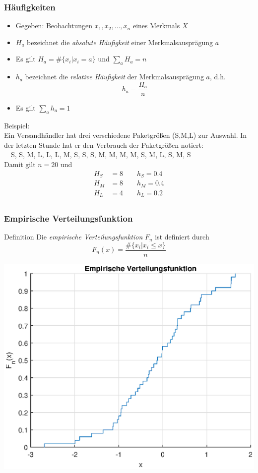 \begin{frame}
\frametitle{Häufigkeiten}
\begin{itemize}
\item Gegeben: Beobachtungen $x_1,x_2,\ldots,x_n$ eines Merkmals $X$
\pause
\item $H_a$ bezeichnet die \textit{absolute Häufigkeit} einer Merkmalsausprägung $a$
\pause
\item Es gilt $H_a = \# \{x_i | x_i=a \}$ und $\sum_a H_a = n$
\pause
\item $h_a$ bezeichnet die \textit{relative Häufigkeit} der Merkmalsausprägung $a$, d.h. \[
h_a = \frac{H_a}{n} \]
\pause
\item Es gilt $\sum_a h_a = 1$
\pause
\end{itemize}
\pause
Beispiel:\\
Ein Versandhändler hat drei verschiedene Paketgrößen (S,M,L) zur Auswahl. In der letzten Stunde hat er den Verbrauch der Paketgrößen notiert:\\
$\quad$S, S, M, L, L, L, M, S, S, S, M, M, M, M, S, M, L, S, M, S\\
\pause
Damit gilt $n = 20$ und
\begin{align*}
H_S &= 8 \quad\quad h_S = 0.4\\
H_M &= 8 \quad\quad h_M = 0.4\\
H_L &= 4 \quad\quad h_L = 0.2\\
\end{align*}
\end{frame}
\begin{frame}
\frametitle{Empirische Verteilungsfunktion}

\begin{block}{Definition}
Die \textit{empirische Verteilungsfunktion} $F_n$ ist definiert durch\[
F_n(x) = \frac{\#\{x_i| x_i \leq x\}}{n}
\]
\end{block}
\pause
\begin{center}
\includegraphics[scale=0.4]{images/empirische_verteilungsfunktion_bsp.eps} 
\end{center}
\end{frame}
